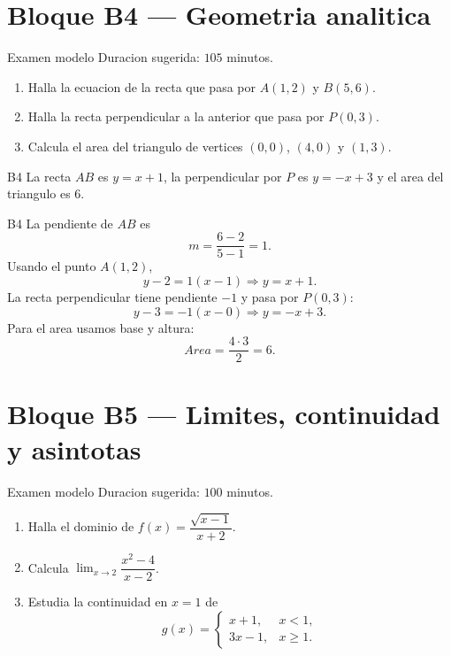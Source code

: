 \section{Bloque B4 --- Geometria analitica}

\begin{exambrief}{Examen modelo}
Duracion sugerida: \(105\) minutos.
\begin{enumerate}
  \item Halla la ecuacion de la recta que pasa por \(A(1,2)\) y \(B(5,6)\).
  \item Halla la recta perpendicular a la anterior que pasa por \(P(0,3)\).
  \item Calcula el area del triangulo de vertices \((0,0)\), \((4,0)\) y \((1,3)\).
\end{enumerate}
\end{exambrief}

\begin{shortanswer}{B4}
La recta \(AB\) es \(y=x+1\), la perpendicular por \(P\) es \(y=-x+3\) y el area del
triangulo es \(6\).
\end{shortanswer}

\begin{fullsolution}{B4}
La pendiente de \(AB\) es
\[
m=\frac{6-2}{5-1}=1.
\]
Usando el punto \(A(1,2)\),
\[
y-2=1(x-1) \Longrightarrow y=x+1.
\]
La recta perpendicular tiene pendiente \(-1\) y pasa por \(P(0,3)\):
\[
y-3=-1(x-0) \Longrightarrow y=-x+3.
\]
Para el area usamos base y altura:
\[
Area=\frac{4\cdot 3}{2}=6.
\]
\end{fullsolution}

\section{Bloque B5 --- Limites, continuidad y asintotas}

\begin{exambrief}{Examen modelo}
Duracion sugerida: \(100\) minutos.
\begin{enumerate}
  \item Halla el dominio de \(f(x)=\dfrac{\sqrt{x-1}}{x+2}\).
  \item Calcula \(\lim_{x\to 2}\dfrac{x^2-4}{x-2}\).
  \item Estudia la continuidad en \(x=1\) de
  \[
  g(x)=
  \begin{cases}
    x+1, & x<1,\\
    3x-1, & x\geq 1.
  \end{cases}
  \]
\end{enumerate}
\end{exambrief}

